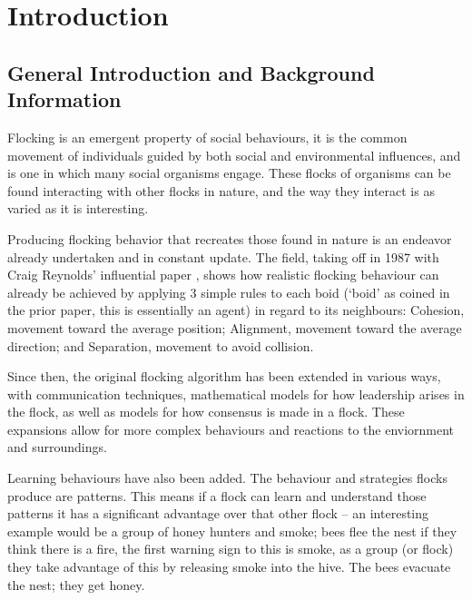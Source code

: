 
\section{Introduction}

\subsection{General Introduction and Background Information} %

Flocking is an emergent property of social behaviours, it is the common movement of individuals guided by both social and environmental influences, and is one in which many social organisms engage. These flocks of organisms can be found interacting with other flocks in nature, and the way they interact is as varied as it is interesting.

Producing flocking behavior that recreates those found in nature is an endeavor already undertaken and in constant update. The field, taking off in 1987 with Craig Reynolds’ influential paper \citep{Reynolds:1987:FHS:37402.37406}, shows how realistic flocking behaviour can already be achieved by applying 3 simple rules to each boid (‘boid’ as coined in the prior paper, this is essentially an agent) in regard to its neighbours: Cohesion, movement toward the average position; Alignment, movement toward the average direction; and Separation, movement to avoid collision. 

Since then, the original flocking algorithm has been extended in various ways, with communication techniques, mathematical models for how leadership arises in the flock, as well as models for how consensus is made in a flock. These expansions allow for more complex behaviours and reactions to the enviornment and surroundings.

Learning behaviours have also been added. The behaviour and strategies flocks produce are patterns. This means if a flock can learn and understand those patterns it has a significant advantage over that other flock – an interesting example would be a group of honey hunters and smoke; bees flee the nest if they think there is a fire, the first warning sign to this is smoke, as a group (or flock) they take advantage of this by releasing smoke into the hive. The bees evacuate the nest; they get honey. 

